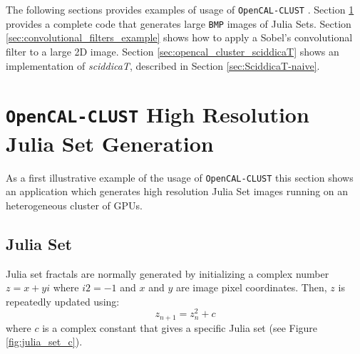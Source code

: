 The following sections provides examples of usage of \texttt{OpenCAL-CLUST} . Section \ref{sec:opencal_julia} provides a complete code that generates large \texttt{BMP} images of Julia Sets.
Section \ref{sec:convolutional_filters_example} shows how to apply a Sobel's convolutional filter to a large 2D image.
Section \ref{sec:opencal_cluster_sciddicaT} shows an implementation of \textit{sciddicaT}, described in Section \ref{sec:SciddicaT-naive}. 
\section{\texttt{OpenCAL-CLUST}  High Resolution Julia Set Generation}
\label{sec:opencal_julia}
As a first illustrative example of the usage of \texttt{OpenCAL-CLUST}  this section shows an application which generates high resolution Julia Set images running on an heterogeneous cluster of GPUs.

\subsection{Julia Set}
\label{sec:julia_math}
Julia set fractals are normally generated by initializing a complex number  $z = x + yi$  where  $i2 = -1$  and $x$ and $y$ are image pixel coordinates. Then, $z$ is repeatedly updated using:
\[ 
 z_{n+1} = z_n^2 + c
\]  
where $c$ is a complex constant that gives a specific Julia set (see Figure \ref{fig:julia_set_c}).

